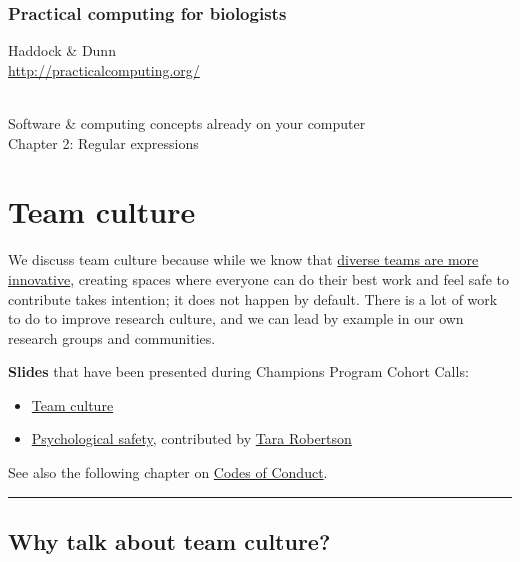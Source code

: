 \documentclass[
  letterpaper,
  DIV=11,
  numbers=noendperiod]{scrreprt}
\providecommand{\tightlist}{%
  \setlength{\itemsep}{0pt}\setlength{\parskip}{0pt}}
\begin{document}
\hypertarget{practical-computing-for-biologists}{%
\subsection{Practical computing for
biologists}\label{practical-computing-for-biologists}}

Haddock \& Dunn\\
\url{http://practicalcomputing.org/}\strut \\
Software \& computing concepts already on your computer\\
Chapter 2: Regular expressions

\hypertarget{team-culture}{%
\chapter{Team culture}\label{team-culture}}

We discuss team culture because while we know that
\href{https://www.scientificamerican.com/article/how-diversity-makes-us-smarter/}{diverse
teams are more innovative}, creating spaces where everyone can do their
best work and feel safe to contribute takes intention; it does not
happen by default. There is a lot of work to do to improve research
culture, and we can lead by example in our own research groups and
communities.

\textbf{Slides} that have been presented during Champions Program Cohort
Calls:

\begin{itemize}
\tightlist
\item
  \href{https://docs.google.com/presentation/d/1QlzV7wjP20GoLwpwUmEfBb_y4AuZnJgU_foI564FhXo/edit?usp=sharing}{Team
  culture}
\item
  \href{https://docs.google.com/presentation/d/1TwCyf9xicLWBfPhW9HnYQH3-mHycEyVKTm38zSg4D3Q/edit?usp=sharing}{Psychological
  safety}, contributed by \href{https://tararobertson.ca/}{Tara
  Robertson}
\end{itemize}

See also the following chapter on
\protect\hyperlink{code-of-conduct}{Codes of Conduct}.

\begin{center}\rule{0.5\linewidth}{0.5pt}\end{center}

\hypertarget{why-talk-about-team-culture}{%
\section{Why talk about team
culture?}\label{why-talk-about-team-culture}}
\end{document}

